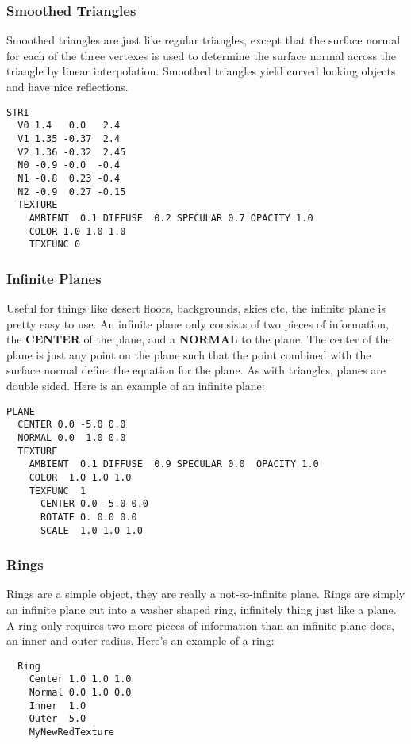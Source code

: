 \subsubsection{Smoothed Triangles}
  Smoothed triangles are just like regular triangles, except that the  
  surface normal for each of the three vertexes is used to determine the
  surface normal across the triangle by linear interpolation.
  Smoothed triangles yield curved looking objects and have nice 
  reflections.  
\begin{verbatim}
STRI 
  V0 1.4   0.0   2.4  
  V1 1.35 -0.37  2.4   
  V2 1.36 -0.32  2.45 
  N0 -0.9 -0.0  -0.4  
  N1 -0.8  0.23 -0.4  
  N2 -0.9  0.27 -0.15 
  TEXTURE
    AMBIENT  0.1 DIFFUSE  0.2 SPECULAR 0.7 OPACITY 1.0
    COLOR 1.0 1.0 1.0
    TEXFUNC 0
\end{verbatim}

\subsubsection{Infinite Planes}
  Useful for things like desert floors, backgrounds, skies etc, the infinite
plane is pretty easy to use.  An infinite plane only consists of two pieces
of information, the {\bf CENTER} of the plane, and a {\bf NORMAL} to the plane.
The center of the plane is just any point on the plane such that the point 
combined with the surface normal define the equation for the plane.
As with triangles, planes are double sided.  Here is an example of an 
infinite plane:
\begin{verbatim}
PLANE
  CENTER 0.0 -5.0 0.0
  NORMAL 0.0  1.0 0.0
  TEXTURE
    AMBIENT  0.1 DIFFUSE  0.9 SPECULAR 0.0  OPACITY 1.0
    COLOR  1.0 1.0 1.0
    TEXFUNC  1
      CENTER 0.0 -5.0 0.0
      ROTATE 0. 0.0 0.0
      SCALE  1.0 1.0 1.0
\end{verbatim}

\subsubsection{Rings}
  Rings are a simple object, they are really a not-so-infinite plane.
Rings are simply an infinite plane cut into a washer shaped ring, infinitely
thing just like a plane.  A ring only requires two more pieces of information
than an infinite plane does, an inner and outer radius.  Here's an example
of a ring:
\begin{verbatim}   
  Ring
    Center 1.0 1.0 1.0
    Normal 0.0 1.0 0.0
    Inner  1.0
    Outer  5.0
    MyNewRedTexture
\end{verbatim}

